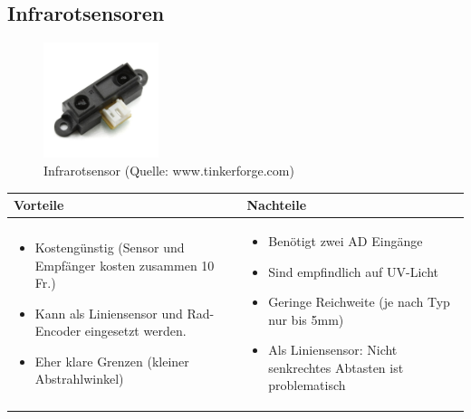 \pagebreak

\subsection{Infrarotsensoren}
\begin{figure}[h]
	\centering
	\includegraphics[width=0.3\textwidth]{fig/Infrarotsensor.jpg}
	\caption{Infrarotsensor (Quelle: www.tinkerforge.com)}
\end{figure}

\begin{table}[h]
\begin{tabular}{p{} | p{}}


\textbf{Vorteile} & \textbf{Nachteile} \\ \hline
	 
\begin{itemize}
\item Kostengünstig (Sensor und Empfänger kosten zusammen 10 Fr.)
\item Kann als Liniensensor und Rad-Encoder eingesetzt werden.
\item Eher klare Grenzen (kleiner Abstrahlwinkel)
\end{itemize}
 &
\begin{itemize}
\item Benötigt zwei AD Eingänge
\item Sind empfindlich auf UV-Licht
\item Geringe Reichweite (je nach Typ nur bis 5mm)
\item Als Liniensensor: Nicht senkrechtes Abtasten ist problematisch
\end{itemize}
\end{tabular}
\end{table}


